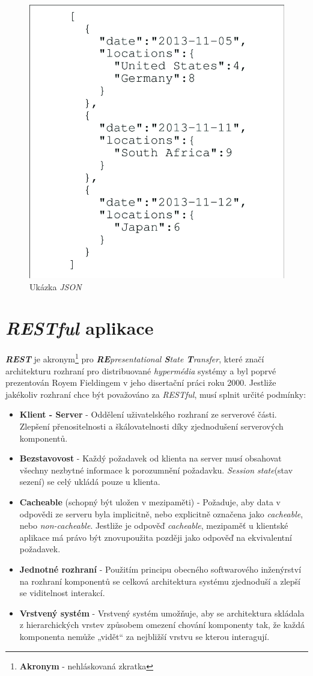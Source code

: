 \begin{figure}[hbt]
  \centering
  \includegraphics[width=.45 \linewidth]{obrazky-figures/json_example.png}
  \caption{Ukázka \emph{JSON}}
  \label{figure:json}
\end{figure}

\newpage
\section{\emph{RESTful} aplikace}
\label{terminy:restful}
\textbf{\emph{REST}} je akronym\footnote{\textbf{Akronym} - nehláskovaná zkratka} pro \emph{\textbf{RE}presentational \textbf{S}tate \textbf{T}ransfer},
které značí architekturu rozhraní pro distribuované \emph{hypermédia} systémy a byl poprvé prezentován Royem Fieldingem v jeho disertační práci roku 2000.
\newline
\newline
Jestliže jakékoliv rozhraní chce být považováno za \emph{RESTful}, musí splnit určité podmínky:
\begin{itemize}
  \item \textbf{Klient - Server} - Oddělení uživatelského rozhraní ze serverové části.
        Zlepšení přenositelnosti a škálovatelnosti díky zjednodušení serverových komponentů.
  \item \textbf{Bezstavovost} - Každý požadavek od klienta na server musí obsahovat všechny nezbytné informace k porozumnění požadavku.
        \emph{Session state}(stav sezení) se celý ukládá pouze u klienta.
  \item \textbf{Cacheable} (schopný být uložen v mezipaměti) - Požaduje, aby data v odpovědi ze serveru byla implicitně, nebo explicitně označena jako \emph{cacheable}, nebo \emph{non-cacheable}.
        Jestliže je odpověď \emph{cacheable}, mezipaměť u klientské aplikace má právo být znovupoužita později jako odpověď na ekvivalentní požadavek.
  \item \textbf{Jednotné rozhraní} - Použitím principu obecného softwarového inženýrství na rozhraní komponentů se celková architektura systému zjednoduší a zlepší se viditelnost interakcí.
  \item \textbf{Vrstvený systém} - Vrstvený systém umožňuje, aby se architektura skládala z hierarchických vrstev způsobem omezení chování komponenty tak, že každá komponenta nemůže „vidět“ za nejbližší vrstvu se kterou interagují.
\end{itemize}

